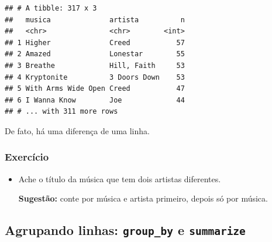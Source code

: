 \documentclass[
  11pt]{report}
\begin{document}
\begin{itemize}
\begin{verbatim}
## # A tibble: 317 x 3
##   musica              artista          n
##   <chr>               <chr>        <int>
## 1 Higher              Creed           57
## 2 Amazed              Lonestar        55
## 3 Breathe             Hill, Faith     53
## 4 Kryptonite          3 Doors Down    53
## 5 With Arms Wide Open Creed           47
## 6 I Wanna Know        Joe             44
## # ... with 311 more rows
\end{verbatim}

  De fato, há uma diferença de uma linha.
\end{itemize}

\hypertarget{exercuxedcio-1}{%
\subsubsection{Exercício}\label{exercuxedcio-1}}

\begin{itemize}
\item
  Ache o título da música que tem dois artistas diferentes.

  \textbf{Sugestão:} conte por música e artista primeiro, depois só por música.
\end{itemize}

\hypertarget{agrupando-linhas-group_by-e-summarize}{%
\subsection{\texorpdfstring{Agrupando linhas: \texttt{group\_by} e \texttt{summarize}}{Agrupando linhas: group\_by e summarize}}\label{agrupando-linhas-group_by-e-summarize}}
\end{document}
